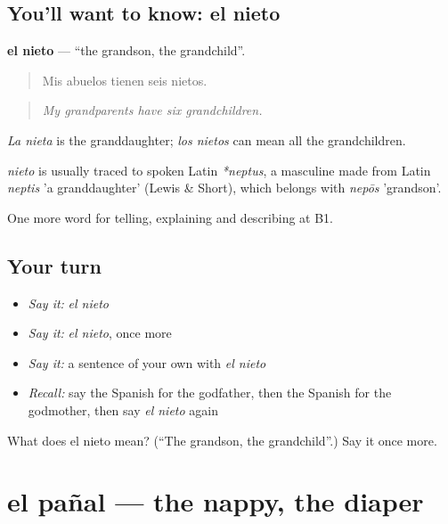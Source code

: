 \subsection*{You'll want to know: el nieto}
\textbf{el nieto} — \textquotedblleft{}the grandson, the grandchild\textquotedblright{}.

\begin{quote}
Mis abuelos tienen seis nietos.
\end{quote}

\begin{quote}
\emph{My grandparents have six grandchildren.}
\end{quote}

\emph{La nieta} is the granddaughter; \emph{los nietos} can mean all the grandchildren.

\begin{cousinweb}
\emph{nieto} is usually traced to spoken Latin \emph{*neptus}, a masculine made from Latin \emph{neptis} 'a granddaughter' (Lewis \& Short), which belongs with \emph{nepōs} 'grandson'.
\end{cousinweb}

\begin{grammarlens}[title={What you've built}]
One more word for telling, explaining and describing at B1.
\end{grammarlens}

\subsection*{Your turn}
\begin{itemize}
\raggedright
  \item \emph{Say it:} \emph{el nieto}
  \item \emph{Say it:} \emph{el nieto}, once more
  \item \emph{Say it:} a sentence of your own with \emph{el nieto}
  \item \emph{Recall:} say the Spanish for the godfather, then the Spanish for the godmother, then say \emph{el nieto} again
\end{itemize}

\begin{tcolorbox}[breakable,colback=teal!4,colframe=teal!35!black,title={Before you move on}]
What does el nieto mean? (\textquotedblleft{}The grandson, the grandchild\textquotedblright{}.) Say it once more.
\end{tcolorbox}
\section[el pañal]{el pañal — the nappy, the diaper}

